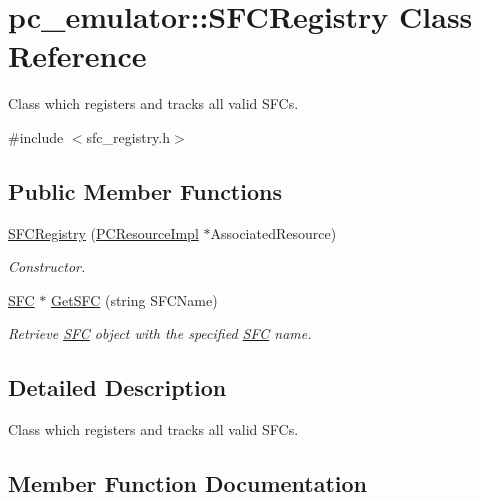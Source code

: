 \hypertarget{classpc__emulator_1_1SFCRegistry}{}\section{pc\+\_\+emulator\+:\+:S\+F\+C\+Registry Class Reference}
\label{classpc__emulator_1_1SFCRegistry}


Class which registers and tracks all valid S\+F\+Cs.  




{\ttfamily \#include $<$sfc\+\_\+registry.\+h$>$}

\subsection*{Public Member Functions}
\begin{DoxyCompactItemize}
\item 
\hyperlink{classpc__emulator_1_1SFCRegistry_a899569d48a587ba8c883c47997411f37}{S\+F\+C\+Registry} (\hyperlink{classpc__emulator_1_1PCResourceImpl}{P\+C\+Resource\+Impl} $\ast$Associated\+Resource)\hypertarget{classpc__emulator_1_1SFCRegistry_a899569d48a587ba8c883c47997411f37}{}\label{classpc__emulator_1_1SFCRegistry_a899569d48a587ba8c883c47997411f37}

\begin{DoxyCompactList}\small\item\em Constructor. \end{DoxyCompactList}\item 
\hyperlink{classpc__emulator_1_1SFC}{S\+FC} $\ast$ \hyperlink{classpc__emulator_1_1SFCRegistry_a34a5d75497ff2d4756514f640d45f328}{Get\+S\+FC} (string S\+F\+C\+Name)
\begin{DoxyCompactList}\small\item\em Retrieve \hyperlink{classpc__emulator_1_1SFC}{S\+FC} object with the specified \hyperlink{classpc__emulator_1_1SFC}{S\+FC} name. \end{DoxyCompactList}\end{DoxyCompactItemize}


\subsection{Detailed Description}
Class which registers and tracks all valid S\+F\+Cs. 

\subsection{Member Function Documentation}
